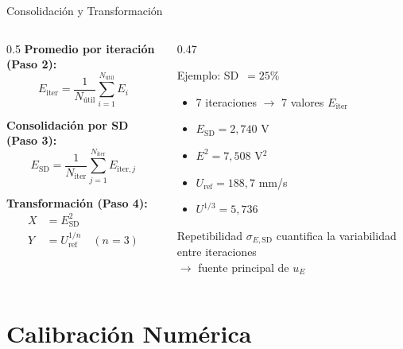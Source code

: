 \documentclass[aspectratio=169,12pt]{beamer}
\begin{document}
\begin{frame}{Consolidación y Transformación}
	\begin{columns}
		\begin{column}{0.5\textwidth}
			\textbf{Promedio por iteración (Paso 2):}
			\begin{equation*}
				E_\mathrm{iter} = \frac{1}{N_\mathrm{útil}}
				\sum_{i=1}^{N_\mathrm{útil}} E_i
			\end{equation*}

			\textbf{Consolidación por SD (Paso 3):}
			\begin{equation*}
				E_\mathrm{SD} = \frac{1}{N_\mathrm{iter}}
				\sum_{j=1}^{N_\mathrm{iter}} E_{\mathrm{iter},j}
			\end{equation*}

			\textbf{Transformación (Paso 4):}
			\begin{align*}
				X & = E_\mathrm{SD}^2                  \\
				Y & = U_\mathrm{ref}^{1/n} \quad (n=3)
			\end{align*}
		\end{column}
		\begin{column}{0.47\textwidth}
			\begin{exampleblock}{Ejemplo: SD~$=25\%$}
				\scriptsize
				\begin{itemize}
					\item 7 iteraciones $\to$ 7 valores
					      $E_\mathrm{iter}$
					\item $E_\mathrm{SD} = 2{,}740$ V
					\item $E^2 = 7{,}508$ V$^2$
					\item $U_\mathrm{ref} = 188{,}7$ mm/s
					\item $U^{1/3} = 5{,}736$
				\end{itemize}
			\end{exampleblock}
			\vspace{0.3em}
			\begin{block}{Repetibilidad}
				$\sigma_{E,\mathrm{SD}}$ cuantifica la
				variabilidad entre iteraciones\\
				$\to$ fuente principal de $u_E$
			\end{block}
		\end{column}
	\end{columns}
\end{frame}

\section{Calibración Numérica}
\end{document}
